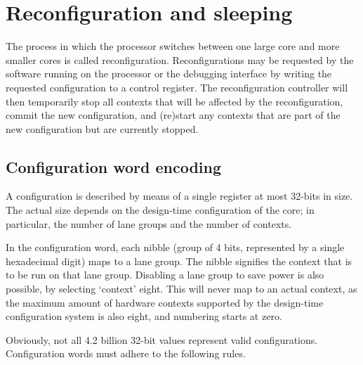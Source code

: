 
\clearpage
\section{Reconfiguration and sleeping}
\label{sec:core-ug-reconf}

The process in which the \rvex{} processor switches between one large core and
more smaller cores is called reconfiguration. Reconfigurations may be requested
by the software running on the processor or the debugging interface by writing
the requested configuration to a control register. The reconfiguration
controller will then temporarily stop all contexts that will be affected by the
reconfiguration, commit the new configuration, and (re)start any contexts that
are part of the new configuration but are currently stopped.

\subsection{Configuration word encoding}
\label{sec:core-ug-reconf-word}

A configuration is described by means of a single register at most 32-bits in
size. The actual size depends on the design-time configuration of the core; in
particular, the number of lane groups and the number of contexts.

In the configuration word, each nibble (group of 4 bits, represented by a single
hexadecimal digit) maps to a lane group. The nibble signifies the context that
is to be run on that lane group. Disabling a lane group to save power is also
possible, by selecting `context' eight. This will never map to an actual
context, as the maximum amount of hardware contexts supported by the design-time
configuration system is also eight, and numbering starts at zero.

Obviously, not all 4.2 billion 32-bit values represent valid configurations.
Configuration words must adhere to the following rules.

